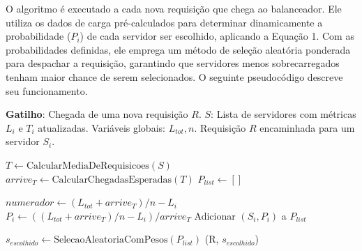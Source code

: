 O algoritmo é executado a cada nova requisição que chega ao balanceador. Ele utiliza os dados de carga pré-calculados para determinar dinamicamente a probabilidade ($P_i$) de cada servidor ser escolhido, aplicando a Equação 1. Com as probabilidades definidas, ele emprega um método de seleção aleatória ponderada para despachar a requisição, garantindo que servidores menos sobrecarregados tenham maior chance de serem selecionados. O seguinte pseudocódigo descreve seu funcionamento.


\begin{algorithm}[H]
\caption{Seleção de Servidor por Requisição}
\begin{algorithmic}[1]
\Statex \textbf{Gatilho}: Chegada de uma nova requisição $R$.
\Require
    \Statex $S$: Lista de servidores com métricas $L_i$ e $T_i$ atualizadas.
    \Statex Variáveis globais: $L_{tot}, n$.
\Ensure
    \Statex Requisição $R$ encaminhada para um servidor $S_{i}$.

    \State $T \leftarrow \text{CalcularMediaDeRequisicoes}(S)$
    \State $arrive_T \leftarrow \text{CalcularChegadasEsperadas}(T)$
    \State $P_{list} \leftarrow []$ 
    
        \State $numerador \leftarrow (L_{tot} + arrive_T)/n - L_i$
        \State $P_i \leftarrow ((L_{tot} + arrive_T)/n - L_i) / arrive_T$ 
        \State Adicionar $(S_i, P_i)$ a $P_{list}$
    \EndFor
    
    \State $s_{escolhido} \leftarrow \text{SelecaoAleatoriaComPesos}(P_{list})$
    \State {}(R, $s_{escolhido}$)
\EndProcedure
\end{algorithmic}
\end{algorithm}


